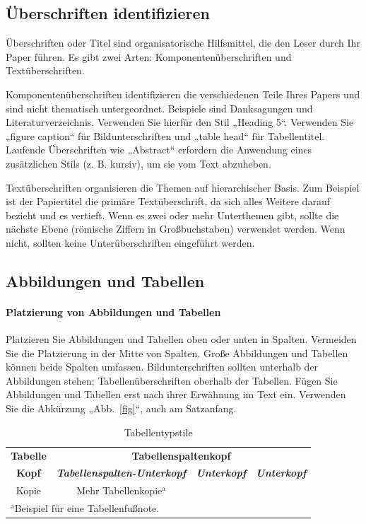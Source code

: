 \documentclass[conference]{IEEEtran}
\begin{document}
\subsection{Überschriften identifizieren}
Überschriften oder Titel sind organisatorische Hilfsmittel, die den Leser durch
Ihr Paper führen. Es gibt zwei Arten: Komponentenüberschriften und Textüberschriften.

Komponentenüberschriften identifizieren die verschiedenen Teile Ihres Papers und sind nicht
thematisch untergeordnet. Beispiele sind Danksagungen und
Literaturverzeichnis. Verwenden Sie hierfür den Stil „Heading 5“. Verwenden Sie
„figure caption“ für Bildunterschriften und „table head“ für Tabellentitel. Laufende Überschriften wie „Abstract“ erfordern die Anwendung eines
zusätzlichen Stils (z. B. kursiv), um sie vom Text abzuheben.

Textüberschriften organisieren die Themen auf hierarchischer Basis.
Zum Beispiel ist der Papiertitel die primäre Textüberschrift, da sich alles Weitere
darauf bezieht und es vertieft. Wenn es zwei oder mehr Unterthemen gibt, sollte die nächste Ebene (römische Ziffern in Großbuchstaben) verwendet werden. Wenn nicht, sollten keine Unterüberschriften eingeführt werden.

\subsection{Abbildungen und Tabellen}
\paragraph{Platzierung von Abbildungen und Tabellen} Platzieren Sie Abbildungen und Tabellen oben oder unten in Spalten. Vermeiden Sie die Platzierung in der Mitte von Spalten. Große
Abbildungen und Tabellen können beide Spalten umfassen. Bildunterschriften sollten unterhalb der Abbildungen stehen; Tabellenüberschriften oberhalb der Tabellen. Fügen Sie
Abbildungen und Tabellen erst nach ihrer Erwähnung im Text ein. Verwenden Sie die Abkürzung
„Abb.~\ref{fig}“, auch am Satzanfang.

\begin{table}[htbp]
\caption{Tabellentypstile}
\begin{center}
\begin{tabular}{|c|c|c|c|}
\hline
\textbf{Tabelle}&\multicolumn{3}{|c|}{\textbf{Tabellenspaltenkopf}} \\
\cline{2-4} 
\textbf{Kopf} & \textbf{\textit{Tabellenspalten-Unterkopf}}& \textbf{\textit{Unterkopf}}& \textbf{\textit{Unterkopf}} \\
\hline
Kopie& Mehr Tabellenkopie$^{\mathrm{a}}$& &  \\
\hline
\multicolumn{4}{l}{$^{\mathrm{a}}$Beispiel für eine Tabellenfußnote.}
\end{tabular}
\label{tab1}
\end{center}
\end{table}
\end{document}
